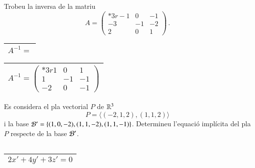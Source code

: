 \documentclass[11pt,catalan]{article}
\begin{document}
\begin{enunciat}
Trobeu la inversa de la matriu 
\[
  A = \begin{pmatrix}{*{3}r} -1 & 0 & -1\\ -3 & -1 & -2\\ 2 & 0 & 1\end{pmatrix}\,.
\]
\end{enunciat}

\begin{quadricula}
\begin{tabular}{|L{5cm}{1.25cm}|}
\hline
$A^{-1}=$ \\
\hline
\end{tabular}
\end{quadricula}

\begin{solucio}
\begin{center}
\begin{tabular}{|C{5cm}{1.25cm}|}
\hline
$A^{-1}=\begin{pmatrix}{*{3}r} 1 & 0 & 1\\ 1 & -1 & -1\\ -2 & 0 & -1\end{pmatrix}$ \\
\hline
\end{tabular}
\end{center}
\end{solucio}


\begin{enunciat}
Es considera el pla vectorial $P$ de $\rn 3$
\[
  P = \langle (-2,1,2), (1,1,2) \rangle
\]
i la base $\cal B'=\{(1,0,-2),(1,1,-2),(1,1,-1)\}$. Determineu l'equació implícita del pla $P$ respecte de la base $\cal B'$.
\end{enunciat}

\begin{quadricula}
\begin{tabular}{|C{5cm}{0.5cm}|}
\hline
 \\
\hline
\end{tabular}
\end{quadricula}

\begin{solucio}
\begin{center}
\begin{tabular}{|C{5cm}{0.5cm}|}
\hline
$2 x' + 4 y' + 3 z' = 0$ \\
\hline
\end{tabular}
\end{center}
\end{solucio}
\end{document}
